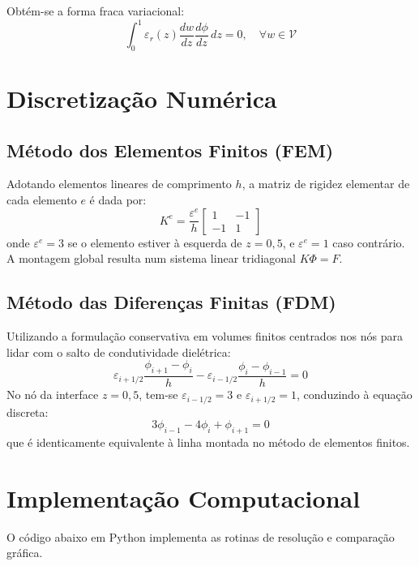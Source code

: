 \documentclass[12pt,a4paper]{article}
\begin{document}
Obtém-se a forma fraca variacional:
\begin{equation}
    \int_0^1 \varepsilon_r(z) \frac{dw}{dz} \frac{d\phi}{dz} \, dz = 0, \quad \forall w \in \mathcal{V}
\end{equation}

\section{Discretização Numérica}

\subsection{Método dos Elementos Finitos (FEM)}
Adotando elementos lineares de comprimento $h$, a matriz de rigidez elementar de cada elemento $e$ é dada por:
\begin{equation}
    K^e = \frac{\varepsilon^e}{h} \begin{bmatrix} 1 & -1 \\ -1 & 1 \end{bmatrix}
\end{equation}
onde $\varepsilon^e = 3$ se o elemento estiver à esquerda de $z = 0{,}5$, e $\varepsilon^e = 1$ caso contrário. A montagem global resulta num sistema linear tridiagonal $K \Phi = F$.

\subsection{Método das Diferenças Finitas (FDM)}
Utilizando a formulação conservativa em volumes finitos centrados nos nós para lidar com o salto de condutividade dielétrica:
\begin{equation}
    \varepsilon_{i+1/2}\frac{\phi_{i+1} - \phi_i}{h} - \varepsilon_{i-1/2}\frac{\phi_i - \phi_{i-1}}{h} = 0
\end{equation}
No nó da interface $z = 0{,}5$, tem-se $\varepsilon_{i-1/2} = 3$ e $\varepsilon_{i+1/2} = 1$, conduzindo à equação discreta:
\begin{equation}
    3\phi_{i-1} - 4\phi_i + \phi_{i+1} = 0
\end{equation}
que é identicamente equivalente à linha montada no método de elementos finitos.

\section{Implementação Computacional}
O código abaixo em Python implementa as rotinas de resolução e comparação gráfica.
\end{document}
